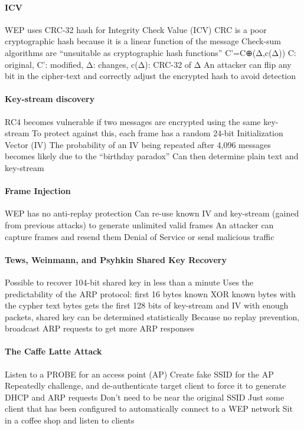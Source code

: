 \documentclass[pdftex, 12pt, a4paper]{article}
\begin{document}
\paragraph{ICV}
WEP uses CRC-32 hash for Integrity Check Value (ICV)
CRC is a poor cryptographic hash because it is a linear function of the message
Check-sum algorithms are ``unsuitable as cryptographic hash functions''
C'=C⊕(Δ,c(Δ))
C: original, C': modified, Δ: changes, c(Δ): CRC-32 of Δ
An attacker can flip any bit in the
cipher-text and correctly adjust the encrypted hash to avoid detection

\paragraph{Key-stream discovery}
RC4 becomes vulnerable if two messages are encrypted using the same key-stream
To protect against this, each frame has a random 24-bit Initialization Vector (IV)
The probability of an IV being repeated after 4,096 messages becomes likely due to the ``birthday paradox''
Can then determine plain text and key-stream

\paragraph{Frame Injection}
WEP has no anti-replay protection
Can re-use known IV and key-stream (gained from previous attacks) to generate unlimited valid frames
An attacker can capture frames and resend them
Denial of Service or send malicious traffic

\paragraph{Tews, Weinmann, and Psyhkin Shared Key Recovery}
Possible to recover 104-bit shared key in less than a minute
Uses the predictability of the ARP protocol: first 16 bytes known
XOR known bytes with the cypher text bytes
gets the first 128 bits of key-stream and IV
with enough packets, shared key can be determined statistically
Because no replay prevention, broadcast ARP requests to get more ARP responses

\paragraph{The Caffe Latte Attack}
Listen to a PROBE for an access point (AP)
Create fake SSID for the AP
Repeatedly challenge, and de-authenticate target client to force it to generate DHCP and ARP requests
Don't need to be near the original SSID
Just some client that has been configured to automatically connect to a WEP network
Sit in a coffee shop and listen to clients
\end{document}
